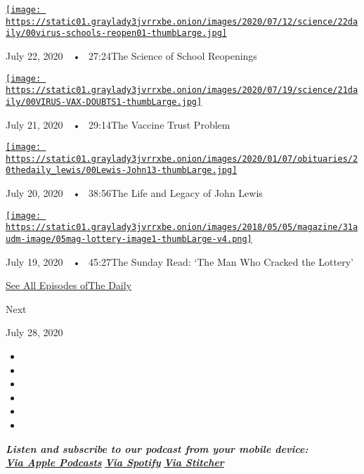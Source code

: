 \href{https://www.nytimes3xbfgragh.onion/2020/07/22/podcasts/the-daily/school-reopenings-coronavirus.html?action=click\&module=audio-series-bar\&region=header\&pgtype=Article}{\texttt{[image: https://static01.graylady3jvrrxbe.onion/images/2020/07/12/science/22daily/00virus-schools-reopen01-thumbLarge.jpg]}}

July 22, 2020~~•~ 27:24The Science of School Reopenings

\href{https://www.nytimes3xbfgragh.onion/2020/07/21/podcasts/the-daily/coronavirus-vaccine.html?action=click\&module=audio-series-bar\&region=header\&pgtype=Article}{\texttt{[image: https://static01.graylady3jvrrxbe.onion/images/2020/07/19/science/21daily/00VIRUS-VAX-DOUBTS1-thumbLarge.jpg]}}

July 21, 2020~~•~ 29:14The Vaccine Trust Problem

\href{https://www.nytimes3xbfgragh.onion/2020/07/20/podcasts/the-daily/john-lewis.html?action=click\&module=audio-series-bar\&region=header\&pgtype=Article}{\texttt{[image: https://static01.graylady3jvrrxbe.onion/images/2020/01/07/obituaries/20thedaily\_lewis/00Lewis-John13-thumbLarge.jpg]}}

July 20, 2020~~•~ 38:56The Life and Legacy of John Lewis

\href{https://www.nytimes3xbfgragh.onion/2020/07/19/podcasts/the-daily/lottery-winner-scam.html?action=click\&module=audio-series-bar\&region=header\&pgtype=Article}{\texttt{[image: https://static01.graylady3jvrrxbe.onion/images/2018/05/05/magazine/31audm-image/05mag-lottery-image1-thumbLarge-v4.png]}}

July 19, 2020~~•~ 45:27The Sunday Read: `The Man Who Cracked the
Lottery'

\href{https://www.nytimes3xbfgragh.onion/column/the-daily}{See All
Episodes ofThe Daily}

Next

July 28, 2020

\begin{itemize}
\item
\item
\item
\item
\item
\item
\end{itemize}

\emph{\textbf{Listen and subscribe to our podcast from your mobile
device:}}\\
\textbf{\href{https://itunes.apple.com/us/podcast/the-daily/id1200361736?mt=2}{\emph{Via
Apple Podcasts}}} \emph{\textbf{\textbar{}}}
\textbf{\href{https://open.spotify.com/show/3IM0lmZxpFAY7CwMuv9H4g?si=SfuMSC55R1qprFsRZU3_zw}{\emph{Via
Spotify}}} \emph{\textbf{\textbar{}}}
\textbf{\href{http://www.stitcher.com/podcast/the-new-york-times/the-daily-10}{\emph{Via
Stitcher}}}

